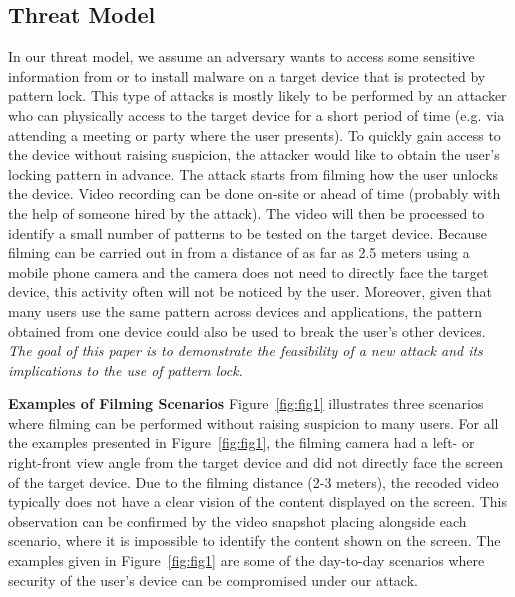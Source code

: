     \subsection{Threat Model}
    \label{sec:scenarios}
        In our threat model, we assume an adversary wants to access some sensitive information from or to install malware on a target device that is protected by pattern lock.
        This type of attacks is mostly likely to be performed by an attacker
         who can physically access to the
        target device for a short period of time (e.g. via  attending a meeting or party where the user presents). To quickly gain access to the device without raising suspicion, the attacker would like to obtain the user's locking pattern in advance.
        The attack starts from filming how the user unlocks the device. Video recording can be done on-site or ahead of time (probably with the help of someone hired by the attack).
        The video will then be processed to identify a small number of patterns to be tested on the target device.
        Because filming can be carried out in from a distance of as far as 2.5 meters using a mobile phone camera and the camera does not need to directly face the target device, this activity often will not be noticed by the user.
        Moreover, given that many users
         use the same pattern across devices and applications, the pattern obtained from one device could also be used to break the user's other devices.  \emph{The goal of this paper is to
        demonstrate the feasibility of a new attack and its implications to
        the use of pattern lock.}

        \noindent \textbf{Examples of Filming Scenarios} Figure~\ref{fig:fig1} illustrates three scenarios where filming can be
        performed without raising suspicion to many users. For all the examples presented in Figure~\ref{fig:fig1}, the
        filming camera had a left- or right-front view angle from the target device and did not directly face the screen of the target device. Due to the filming distance (2-3 meters), the recoded video typically does not have a clear vision of
        the content displayed on the screen.  This observation can be confirmed by the video snapshot placing
        alongside each scenario, where it is impossible to identify the content shown on the screen.
        The examples given in Figure~\ref{fig:fig1} are some of the day-to-day
        scenarios where security of the user's device can be compromised under
        our attack.


